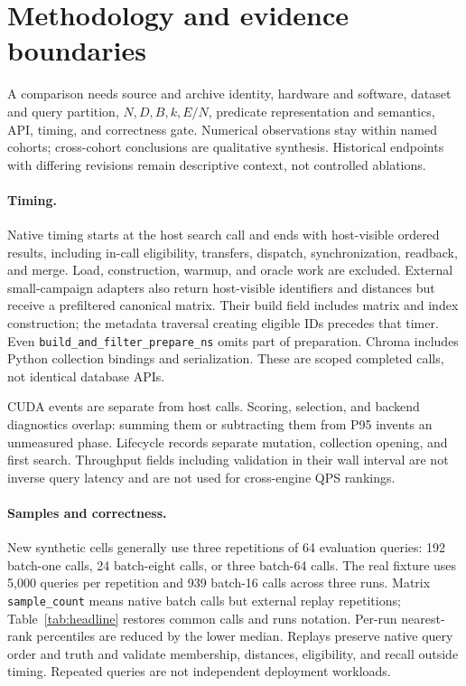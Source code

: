 \documentclass[10pt]{article}
\begin{document}
\section{Methodology and evidence boundaries}
A comparison needs source and archive identity, hardware and software, dataset and query partition, $N,D,B,k,E/N$, predicate representation and semantics, API, timing, and correctness gate. Numerical observations stay within named cohorts; cross-cohort conclusions are qualitative synthesis. Historical endpoints with differing revisions remain descriptive context, not controlled ablations.

\paragraph{Timing.}
Native timing starts at the host search call and ends with host-visible ordered results, including in-call eligibility, transfers, dispatch, synchronization, readback, and merge. Load, construction, warmup, and oracle work are excluded. External small-campaign adapters also return host-visible identifiers and distances but receive a prefiltered canonical matrix. Their build field includes matrix and index construction; the metadata traversal creating eligible IDs precedes that timer. Even \texttt{build\_and\_filter\_prepare\_ns} omits part of preparation. Chroma includes Python collection bindings and serialization. These are scoped completed calls, not identical database APIs.

CUDA events are separate from host calls. Scoring, selection, and backend diagnostics overlap: summing them or subtracting them from P95 invents an unmeasured phase. Lifecycle records separate mutation, collection opening, and first search. Throughput fields including validation in their wall interval are not inverse query latency and are not used for cross-engine QPS rankings.

\paragraph{Samples and correctness.}
New synthetic cells generally use three repetitions of 64 evaluation queries: 192 batch-one calls, 24 batch-eight calls, or three batch-64 calls. The real fixture uses 5,000 queries per repetition and 939 batch-16 calls across three runs. Matrix \texttt{sample\_count} means native batch calls but external replay repetitions; Table~\ref{tab:headline} restores common calls and runs notation. Per-run nearest-rank percentiles are reduced by the lower median. Replays preserve native query order and truth and validate membership, distances, eligibility, and recall outside timing. Repeated queries are not independent deployment workloads.
\end{document}
